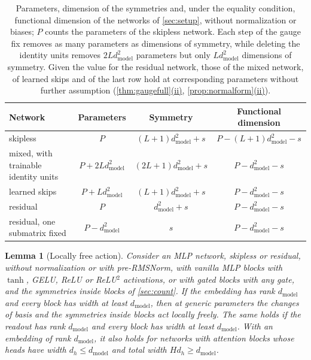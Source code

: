 \documentclass[10pt]{article}
\newtheorem{lemma}[theorem]{Lemma}
\theoremstyle{definition}
\theoremstyle{remark}
\newcommand{\dm}{d_{\mathrm{model}}}
\DeclareRobustCommand{\cpref}[2]{\hyperref[#1:#2]{\cref*{#1}(#2)}}
\begin{document}
\begin{table}[ht]
\centering\small
\caption{Parameters, dimension of the symmetries and, under the equality condition, functional dimension of the networks of \cref{sec:setup}, without normalization or biases; $P$ counts the parameters of the skipless network. Each step of the gauge fix removes as many parameters as dimensions of symmetry, while deleting the identity units removes $2L\dm^2$ parameters but only $L\dm^2$ dimensions of symmetry. Given the value for the residual network, those of the mixed network, of learned skips and of the last row hold at corresponding parameters without further assumption (\cpref{thm:gaugefull}{ii}, \cpref{prop:normalform}{ii}).}
\label{tab:ledger}
\begin{tabular}{lccc}
\toprule
Network & Parameters & Symmetry & Functional dimension \\
\midrule
skipless & $P$ & $(L+1)\dm^2 + s$ & $P - (L+1)\dm^2 - s$ \\
mixed, with trainable identity units & $P + 2L\dm^2$ & $(2L+1)\dm^2 + s$ & $P - \dm^2 - s$ \\
learned skips & $P + L\dm^2$ & $(L+1)\dm^2 + s$ & $P - \dm^2 - s$ \\
residual & $P$ & $\dm^2 + s$ & $P - \dm^2 - s$ \\
residual, one submatrix fixed & $P - \dm^2$ & $s$ & $P - \dm^2 - s$ \\
\bottomrule
\end{tabular}
\end{table}

\begin{lemma}[Locally free action]\label{lem:free}
Consider an MLP network, skipless or residual, without normalization or with pre-RMSNorm, with vanilla MLP blocks with $\tanh$, GELU, ReLU or ReLU$^2$ activations, or with gated blocks with any gate, and the symmetries inside blocks of \cref{sec:count}. If the embedding has rank $\dm$ and every block has width at least $\dm$, then at generic parameters the changes of basis and the symmetries inside blocks act locally freely. The same holds if the readout has rank $\dm$ and every block has width at least $\dm$. With an embedding of rank $\dm$, it also holds for networks with attention blocks whose heads have width $d_h \le \dm$ and total width $Hd_h \ge \dm$.
\end{lemma}
\end{document}
